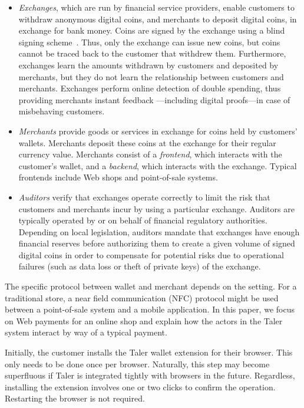 \documentclass{llncs}
\begin{document}
\begin{itemize}
\item
{\em Exchanges}, which are run by financial service providers, enable
customers to withdraw anonymous digital coins,
and merchants to deposit digital coins, in exchange for
bank money.  Coins are signed by the exchange using
a blind signing scheme~\cite{chaum1983blind}.  Thus, only
the exchange can issue new coins, but coins cannot be traced back
to the customer that withdrew them.
Furthermore, exchanges learn the amounts withdrawn by customers
and deposited by merchants, but they do not learn the relationship
between customers and merchants.  Exchanges perform online detection
of double spending, thus providing merchants instant feedback
---including digital proofs---in case of misbehaving customers.

\item
{\em Merchants} provide goods or services in exchange for coins held
by customers' wallets.  Merchants deposit these coins at the
exchange for their regular currency value.  Merchants consist of a
{\em frontend}, which interacts with the customer's wallet, and a {\em
backend}, which interacts with the exchange.  Typical frontends include
Web shops and point-of-sale systems.

\item
{\em Auditors} verify that exchanges operate correctly to limit the risk
that customers and merchants incur by using a particular exchange.
Auditors are typically operated by or on behalf of financial regulatory authorities.
Depending on local legislation, auditors mandate that exchanges
have enough financial reserves before authorizing them to create a given
volume of signed digital coins in order to compensate for potential risks due to
operational failures (such as data loss or theft of private keys) of the exchange.
\end{itemize}


The specific protocol between wallet and merchant depends on the
setting.  For a traditional store, a near field communication (NFC)
protocol might be used between a point-of-sale system and a mobile
application.  In this paper, we focus on Web payments for an online
shop and explain how the actors in the Taler system interact by way of
a typical payment.

Initially, the customer installs the Taler wallet extension for
their browser.  This only needs to be done once per
browser. Naturally, this step may become superfluous if Taler is
integrated tightly with browsers in the future.  Regardless,
installing the extension involves one or two clicks to confirm the
operation. Restarting the browser is not required.
\end{document}
